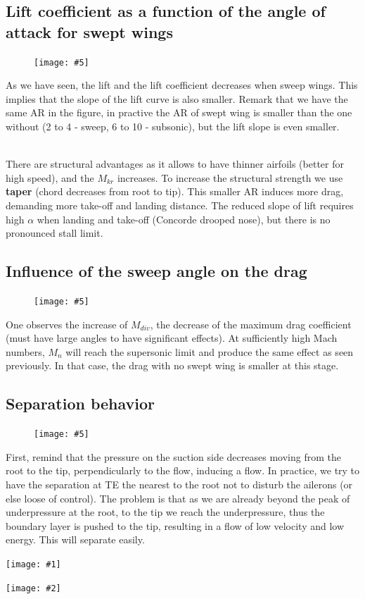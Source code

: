 \documentclass[british,french,11pt, a4paper, openany]{article}
\newcommand{\wrapfig}[6]{%
	\begin{figure}%
		\vspace{-5mm}%
		\texttt{[image: \#5]}%
		\captionof{figure}{}%
		\label{#6}%
	\end{figure}%
}
\newcommand{\minifig}[6]{
	\begin{center}%
		\begin{minipage}{#5\textwidth}%
			\texttt{[image: \#1]}%
			\captionof{figure}{}%
			\label{#1}%
		\end{minipage}%
		\begin{minipage}{#6\textwidth}%
			\texttt{[image: \#2]}%
			\captionof{figure}{}%
			\label{#2}%
		\end{minipage}%
	\end{center}
}
\begin{document}
\subsection{Lift coefficient as a function of the angle of attack for swept wings}	
\wrapfig{8}{r}{6}{0.15}{ch7/6}{ch7/6}
As we have seen, the lift and the lift coefficient decreases when sweep wings. This implies that the slope of the lift curve is also smaller. Remark that we have the same AR in the figure, in practive the AR of swept wing is smaller than the one without (2 to 4 - sweep, 6 to 10 - subsonic), but the lift slope is even smaller. 

\ \\ There are structural advantages as it allows to have thinner airfoils (better for high speed), and the $M_{kr}$ increases. To increase the structural strength we use \textbf{taper} (chord decreases from root to tip). This smaller AR induces more drag, demanding more take-off and landing distance. The reduced slope of lift requires high $\alpha$ when landing and take-off (Concorde drooped nose), but there is no pronounced stall limit.    

\subsection{Influence of the sweep angle on the drag}	
\wrapfig{7}{l}{6}{0.1}{ch7/7}{ch7/7}
One observes the increase of $M_{div}$, the decrease of the maximum drag coefficient (must have large angles to have significant effects). At sufficiently high Mach numbers, $M_n$ will reach the supersonic limit and produce the same effect as seen previously. In that case, the drag with no swept wing is smaller at this stage. 

\subsection{Separation behavior}
\wrapfig{9}{r}{6}{0.1}{ch7/8}{ch7/8}
First, remind that the pressure on the suction side decreases moving from the root to the tip, perpendicularly to the flow, inducing a flow. In practice, we try to have the separation at TE the nearest to the root not to disturb the ailerons (or else loose of control). The problem is that as we are already beyond the peak of underpressure at the root, to the tip we reach the underpressure, thus the boundary layer is pushed to the tip, resulting in a flow of low velocity and low energy. This will separate easily. 

\minifig{ch7/9}{ch7/10}{0.12}{0.1}{0.35}{0.3}
\end{document}
